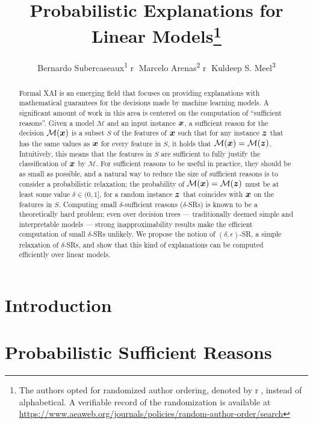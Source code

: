 \documentclass[letterpaper]{article} %
\title{Probabilistic Explanations for Linear Models\thanks{
		The authors
    opted for randomized author ordering, denoted by \textcircled{r},
    instead of alphabetical. A verifiable record of the randomization
    is available at \protect\url{https://www.aeaweb.org/journals/policies/random-author-order/search}}}
\author {
  Bernardo Subercaseaux\textsuperscript{\rm 1} \textcircled{r}  
  Marcelo Arenas\textsuperscript{\rm 2} \textcircled{r}  
  Kuldeep S. Meel\textsuperscript{\rm 3}
}
\newcommand{\M}{\mathcal{M}}
\begin{document}
\maketitle

\begin{abstract}
  Formal XAI is an emerging field that focuses on providing explanations with mathematical guarantees for the decisions made by machine learning models. A significant amount of work in this area is centered on the computation of ``sufficient reasons''. 
  Given a model $\M$ and an input instance ${\bm{x}}$, a sufficient reason for the decision $\M(\vx)$ is a subset $S$ of the features of ${\bm{x}}$ such that for any instance ${\bm{z}}$ that has the same values as ${\bm{x}}$ for every feature in $S$, it holds that $\M(\vx) = \M(\vz)$. 
  Intuitively, this means that the features in $S$ are sufficient to fully justify the classification of ${\bm{x}}$ by $\M$.
  For sufficient reasons to be useful in practice, they should be as small as possible, and a natural way to reduce the size of sufficient reasons is to consider a probabilistic relaxation; the probability of $\M(\vx) = \M(\vz)$ must
  be at least some value $\delta \in (0,1]$, for a random instance ${\bm{z}}$ that coincides with ${\bm{x}}$ on the features in $S$.  Computing small $\delta$-sufficient reasons ($\delta$-SRs) is known to be a theoretically hard problem; even over decision trees — traditionally deemed simple and interpretable models — strong inapproximability results make the efficient computation of small $\delta$-SRs unlikely.
  We propose the notion of $(\delta, \epsilon)$-SR, a simple relaxation of $\delta$-SRs, and show that this kind of explanations can be computed efficiently over linear models. 
\end{abstract}

\begin{links}
\end{links}

\section{Introduction}
\label{sec-into}


\section{Probabilistic Sufficient Reasons}
\label{sec-prop-SR}

\end{document}
